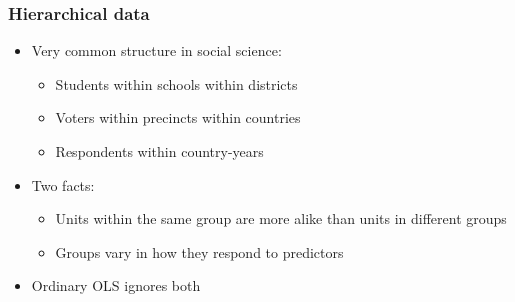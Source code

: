 \begin{frame}
\frametitle{Hierarchical data}
\centering

\begin{itemize}[<+->]
\item Very common structure in social science:
  \begin{itemize}
  \item Students within schools within districts
  \item Voters within precincts within countries
  \item Respondents within country-years
  \end{itemize}
\vspace{8pt}
\item Two facts:
  \begin{itemize}
  \item Units within the same group are more alike than units in different groups
  \item Groups vary in how they respond to predictors
  \end{itemize}
\vspace{8pt}
\item Ordinary OLS ignores both
\end{itemize}

\end{frame}

